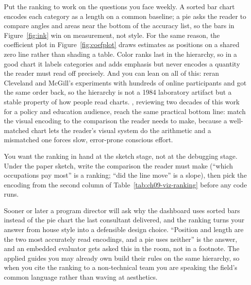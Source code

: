 \documentclass[
    a4paper,
    fontsize=10pt,
    twoside=true,
    numbers=noenddot,
]{kaobook}
\begin{document}
Put the ranking to work on the questions you face weekly. A sorted bar chart encodes each category as a length on a common baseline; a pie asks the reader to compare angles and areas near the bottom of the accuracy list, so the bars in Figure~\ref{fig:ink} win on measurement, not style. For the same reason, the coefficient plot in Figure~\ref{fig:coefplot} draws estimates as positions on a shared zero line rather than shading a table. Color ranks last in the hierarchy, so in a good chart it labels categories and adds emphasis but never encodes a quantity the reader must read off precisely. And you can lean on all of this: \textcite{heer2010crowdsourcing} reran Cleveland and McGill's experiments with hundreds of online participants and got the same order back, so the hierarchy is not a 1984 laboratory artifact but a stable property of how people read charts. \textcite{franconeri2021science}, reviewing two decades of this work for a policy and education audience, reach the same practical bottom line: match the visual encoding to the comparison the reader needs to make, because a well-matched chart lets the reader's visual system do the arithmetic and a mismatched one forces slow, error-prone conscious effort.

You want the ranking in hand at the sketch stage, not at the debugging stage. Under the paper sketch, write the comparison the reader must make (\enquote{which occupations pay most} is a ranking; \enquote{did the line move} is a slope), then pick the encoding from the second column of Table~\ref{tab:ch09-viz-ranking} before any code runs.

Sooner or later a program director will ask why the dashboard uses sorted bars instead of the pie chart the last consultant delivered, and the ranking turns your answer from house style into a defensible design choice. \enquote{Position and length are the two most accurately read encodings, and a pie uses neither} is the answer, and an embedded evaluator gets asked this in the room, not in a footnote. The applied guides you may already own build their rules on the same hierarchy, so when you cite the ranking to a non-technical team you are speaking the field's common language rather than waving at aesthetics.
\end{document}
